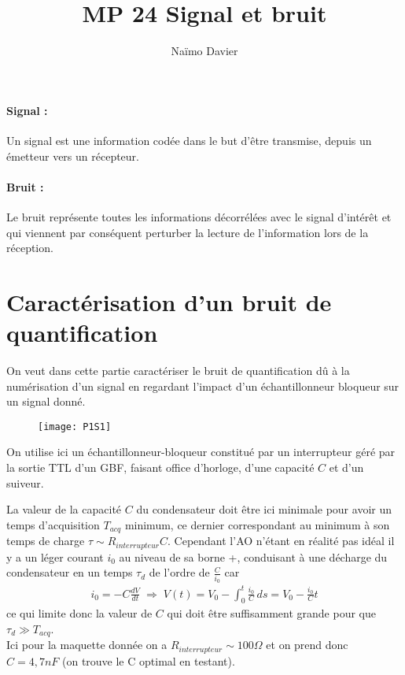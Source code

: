 \documentclass[12pt,prb,aps,epsf]{report}
\begin{document}
	
	\title{MP 24 Signal et bruit}
	\author{Naïmo Davier}
	
	\maketitle
	
	\tableofcontents
	
	\pagebreak
	
	
\paragraph{Signal :} Un signal est une information codée dans le but d'être transmise, depuis un émetteur vers un récepteur.
\paragraph{Bruit :} Le bruit représente toutes les informations décorrélées avec le signal d'intérêt et qui viennent par conséquent perturber la lecture de l'information lors de la réception.

\section{Caractérisation d'un bruit de quantification}
On veut dans cette partie caractériser le bruit de quantification dû à la numérisation d'un signal en regardant l'impact d'un échantillonneur bloqueur sur un signal donné.\\

\begin{figure}[h]
	\centerline{\texttt{[image: P1S1]}}
\end{figure}

On utilise ici un échantillonneur-bloqueur constitué par un interrupteur géré par la sortie TTL d'un GBF, faisant office d'horloge, d'une capacité $C$ et d'un suiveur.

La valeur de la capacité $C$ du condensateur doit être ici minimale pour avoir un temps d'acquisition $T_{acq}$ minimum, ce dernier correspondant au minimum à son temps de charge $\tau \sim R_{interrupteur}C$. Cependant l'AO n'étant en réalité pas idéal il y a un léger courant $i_0$ au niveau de sa borne +, conduisant à une décharge du condensateur en un temps $\tau_d$ de l'ordre de $\frac{C}{i_0}$ car 
\begin{eqnarray}
i_0 = -C\frac{dV}{dt}\; \Rightarrow \; V(t) = V_0 - \int_0^t \frac{i_0}{C}\,ds = V_0-\frac{i_0}{C} t
\end{eqnarray} 
ce qui limite donc la valeur de $C$ qui doit être suffisamment grande pour que $\tau_d \gg T_{acq}$.\\
Ici pour la maquette donnée on a $R_{interrupteur}\sim 100 \Omega$ et on prend donc $C = 4,7nF$ (on trouve le C optimal en testant).\\
\end{document}
